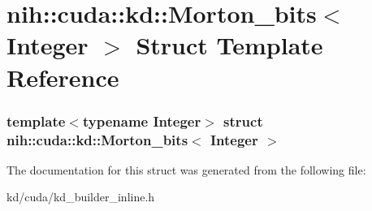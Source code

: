 \hypertarget{structnih_1_1cuda_1_1kd_1_1_morton__bits}{
\section{nih\-:\-:cuda\-:\-:kd\-:\-:\-Morton\-\_\-bits$<$ \-Integer $>$ \-Struct \-Template \-Reference}
\label{structnih_1_1cuda_1_1kd_1_1_morton__bits}
}
\subsubsection*{template$<$typename Integer$>$ struct nih\-::cuda\-::kd\-::\-Morton\-\_\-bits$<$ Integer $>$}



\-The documentation for this struct was generated from the following file\-:\begin{DoxyCompactItemize}
\item 
kd/cuda/kd\-\_\-builder\-\_\-inline.\-h\end{DoxyCompactItemize}
